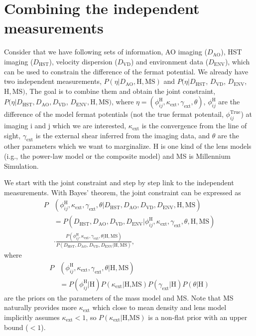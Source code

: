 \documentclass[useAMS,usenatbib]{mnras}
\begin{document}
\section{Combining the independent measurements}
\label{sec:bayesAOplusHST}
Consider that we have following sets of information, AO imaging ($D_{\textrm{AO}}$), HST imaging ($D_{\textrm{HST}}$), velocity dispersion ($D_{\textrm{VD}}$) and environment data ($D_{\textrm{ENV}}$), which can be used to constrain the difference of the fermat potential. We already have two independent measurements, $P(\eta|D_{\textrm{AO}},\textrm{H},\textrm{MS})$ and $P(\eta|D_{\textrm{HST}}$, $D_{\textrm{VD}}$, $D_{\textrm{ENV}}$,$\textrm{H},\textrm{MS})$, 
 The goal is to combine them and obtain the joint constraint, $P(\eta|D_{\textrm{HST}},D_{\textrm{AO}},D_{\textrm{VD}}$, $D_{\textrm{ENV}},\textrm{H},\textrm{MS})$, where $\eta=(\phi_{ij}^{\textrm{H}},\kappa_{\textrm{ext}},\gamma_{\textrm{ext}},\theta)$, $\phi_{ij}^{\textrm{H}}$ are the difference of the model fermat potentials (not the true fermat potentail,
$\phi_{ij}^{\textrm{True}}$) at imaging i and j which we are interested, $\kappa_{\textrm{ext}}$ is the convergence from the line of sight, $\gamma_{\textrm{ext}}$ is the external shear inferred from the imaging data, and $\theta$ are the other parameters which we want to marginalize. H is one kind of the lens models (i.g., the power-law model or the composite model) and MS is Millennium Simulation.

We start with the joint constraint and step by step link to the independent measurements. With Bayes’ theorem, the joint constraint can be expressed as
\begin{equation}
\label{bayes}
\begin{split}
P&(\phi_{ij}^{\textrm{H}},\kappa_{\textrm{ext}},\gamma_{\textrm{ext}},\theta|D_{\textrm{HST}},D_{\textrm{AO}},D_{\textrm{VD}}, D_{\textrm{ENV}},\textrm{H},\textrm{MS})\\
&=P(D_{\textrm{HST}},D_{\textrm{AO}},D_{\textrm{VD}}, D_{\textrm{ENV}}|\phi_{ij}^{\textrm{H}},\kappa_{\textrm{ext}},\gamma_{\textrm{ext}},\theta,\textrm{H},\textrm{MS})\\
&\cdot\frac{P(\phi_{ij}^{\textrm{H}},\kappa_{\textrm{ext}},\gamma_{\textrm{ext}},\theta|\textrm{H},\textrm{MS})}{P(D_{\textrm{HST}},D_{\textrm{AO}},D_{\textrm{VD}}, D_{\textrm{ENV}}|\textrm{H},\textrm{MS})}, 
\end{split}
\end{equation}
where 
\begin{equation}
\begin{split}
P&(\phi_{ij}^{\textrm{H}},\kappa_{\textrm{ext}},\gamma_{\textrm{ext}},\theta|\textrm{H},\textrm{MS})\\
&=P(\phi_{ij}^{\textrm{H}}|\textrm{H})P(\kappa_{\textrm{ext}}|\textrm{H,MS})P(\gamma_{\textrm{ext}}|\textrm{H})P(\theta|\textrm{H})
\end{split}
\end{equation}
are the priors on the parameters of the mass model and MS. Note that MS naturally provides more $\kappa_{\textrm{ext}}$ which close to mean density and lens model implicitly assumes $\kappa_{\textrm{ext}}<1$, so  $P(\kappa_{\textrm{ext}}|\textrm{H,MS})$ is a non-flat prior with an upper bound ($<1$).
\end{document}
